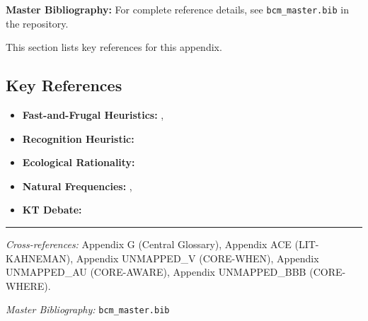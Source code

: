\begin{tcolorbox}[colback=blue!5!white, colframe=blue!75!black]
\textbf{Master Bibliography:} For complete reference details, see
\texttt{bcm\_master.bib} in the repository.

This section lists key references for this appendix.
\end{tcolorbox}

\vspace{0.5em}

\subsection{Key References}

\begin{itemize}[nosep]
    \item \textbf{Fast-and-Frugal Heuristics:} \citet{gigerenzer1996fast}, \citet{gigerenzer1999simple}
    \item \textbf{Recognition Heuristic:} \citet{goldstein2002recognition}
    \item \textbf{Ecological Rationality:} \citet{gigerenzer2001bounded}
    \item \textbf{Natural Frequencies:} \citet{gigerenzer1995improve}, \citet{gigerenzer2012helping}
    \item \textbf{KT Debate:} \citet{gigerenzer1996narrow}
\end{itemize}

\nocite{bcm_master}



\vspace{1em}
\hrule
\vspace{0.5em}

\noindent\textit{Cross-references:}
Appendix G (Central Glossary),
Appendix ACE (LIT-KAHNEMAN),
Appendix UNMAPPED_V (CORE-WHEN),
Appendix UNMAPPED_AU (CORE-AWARE),
Appendix UNMAPPED_BBB (CORE-WHERE).

\noindent\textit{Master Bibliography:} \texttt{bcm\_master.bib}


